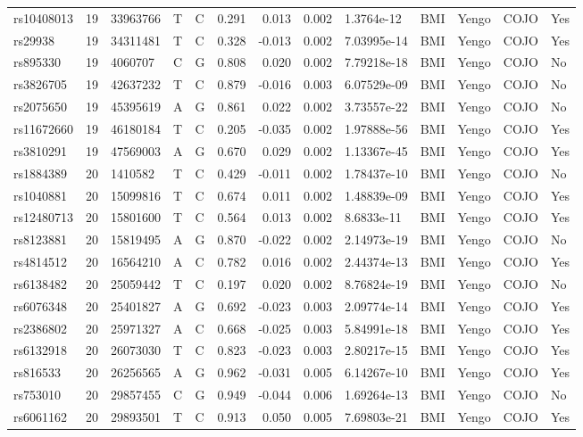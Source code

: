 \documentclass[11pt,twoside]{bristolthesis}
\begin{document}
\begin{longtable}[t]{lrlllrrrlllll}
\addlinespace
rs10408013 & 19 & 33963766 & T & C & 0.291 & 0.013 & 0.002 & 1.3764e-12 & BMI & Yengo & COJO & Yes\\
rs29938 & 19 & 34311481 & T & C & 0.328 & -0.013 & 0.002 & 7.03995e-14 & BMI & Yengo & COJO & Yes\\
rs895330 & 19 & 4060707 & C & G & 0.808 & 0.020 & 0.002 & 7.79218e-18 & BMI & Yengo & COJO & No\\
rs3826705 & 19 & 42637232 & T & C & 0.879 & -0.016 & 0.003 & 6.07529e-09 & BMI & Yengo & COJO & No\\
rs2075650 & 19 & 45395619 & A & G & 0.861 & 0.022 & 0.002 & 3.73557e-22 & BMI & Yengo & COJO & No\\
\addlinespace
rs11672660 & 19 & 46180184 & T & C & 0.205 & -0.035 & 0.002 & 1.97888e-56 & BMI & Yengo & COJO & Yes\\
rs3810291 & 19 & 47569003 & A & G & 0.670 & 0.029 & 0.002 & 1.13367e-45 & BMI & Yengo & COJO & Yes\\
rs1884389 & 20 & 1410582 & T & C & 0.429 & -0.011 & 0.002 & 1.78437e-10 & BMI & Yengo & COJO & No\\
rs1040881 & 20 & 15099816 & T & C & 0.674 & 0.011 & 0.002 & 1.48839e-09 & BMI & Yengo & COJO & Yes\\
rs12480713 & 20 & 15801600 & T & C & 0.564 & 0.013 & 0.002 & 8.6833e-11 & BMI & Yengo & COJO & Yes\\
\addlinespace
rs8123881 & 20 & 15819495 & A & G & 0.870 & -0.022 & 0.002 & 2.14973e-19 & BMI & Yengo & COJO & No\\
rs4814512 & 20 & 16564210 & A & C & 0.782 & 0.016 & 0.002 & 2.44374e-13 & BMI & Yengo & COJO & Yes\\
rs6138482 & 20 & 25059442 & T & C & 0.197 & 0.020 & 0.002 & 8.76824e-19 & BMI & Yengo & COJO & No\\
rs6076348 & 20 & 25401827 & A & G & 0.692 & -0.023 & 0.003 & 2.09774e-14 & BMI & Yengo & COJO & Yes\\
rs2386802 & 20 & 25971327 & A & C & 0.668 & -0.025 & 0.003 & 5.84991e-18 & BMI & Yengo & COJO & Yes\\
\addlinespace
rs6132918 & 20 & 26073030 & T & C & 0.823 & -0.023 & 0.003 & 2.80217e-15 & BMI & Yengo & COJO & Yes\\
rs816533 & 20 & 26256565 & A & G & 0.962 & -0.031 & 0.005 & 6.14267e-10 & BMI & Yengo & COJO & Yes\\
rs753010 & 20 & 29857455 & C & G & 0.949 & -0.044 & 0.006 & 1.69264e-13 & BMI & Yengo & COJO & No\\
rs6061162 & 20 & 29893501 & T & C & 0.913 & 0.050 & 0.005 & 7.69803e-21 & BMI & Yengo & COJO & Yes\\

\end{longtable}
\end{document}
